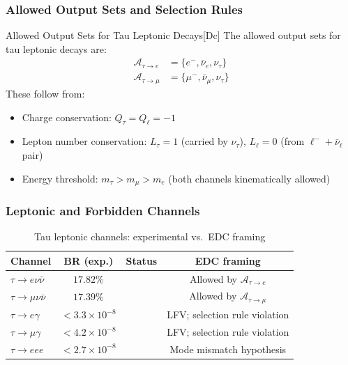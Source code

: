 
\subsubsection{Allowed Output Sets and Selection Rules}

\begin{edcDefinitionBox}{Allowed Output Sets for Tau Leptonic Decays}{[Dc]}
The allowed output sets for tau leptonic decays are:
\begin{align}
    \mathcal{A}_{\tau \to e} &= \{e^-, \bar{\nu}_e, \nu_\tau\} \\
    \mathcal{A}_{\tau \to \mu} &= \{\mu^-, \bar{\nu}_\mu, \nu_\tau\}
\end{align}
These follow from:
\begin{itemize}[nosep]
    \item Charge conservation: $Q_\tau = Q_\ell = -1$
    \item Lepton number conservation: $L_\tau = 1$ (carried by $\nu_\tau$),
          $L_\ell = 0$ (from $\ell^- + \bar{\nu}_\ell$ pair)
    \item Energy threshold: $m_\tau > m_\mu > m_e$ (both channels kinematically allowed)
\end{itemize}
\end{edcDefinitionBox}


\subsubsection{Leptonic and Forbidden Channels}

\begin{table}[htbp]
\centering
\caption{Tau leptonic channels: experimental vs.\ EDC framing}
\label{tab:tau-channels}
\begin{tabular}{lccc}
\toprule
\textbf{Channel} & \textbf{BR (exp.)} & \textbf{Status} & \textbf{EDC framing} \\
\midrule
$\tau \to e\nu\bar{\nu}$ & $17.82\%$ & \tagBL{} & Allowed by $\mathcal{A}_{\tau \to e}$ \tagDc{} \\
$\tau \to \mu\nu\bar{\nu}$ & $17.39\%$ & \tagBL{} & Allowed by $\mathcal{A}_{\tau \to \mu}$ \tagDc{} \\
$\tau \to e\gamma$ & $< 3.3 \times 10^{-8}$ & \tagBL{} & LFV; selection rule violation \tagP{} \\
$\tau \to \mu\gamma$ & $< 4.2 \times 10^{-8}$ & \tagBL{} & LFV; selection rule violation \tagP{} \\
$\tau \to eee$ & $< 2.7 \times 10^{-8}$ & \tagBL{} & Mode mismatch hypothesis \tagP{} \\
\bottomrule
\end{tabular}
\end{table}

